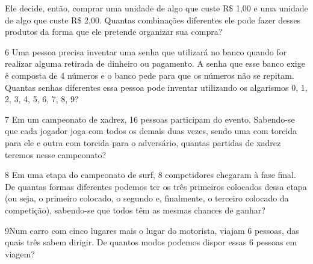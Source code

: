 Ele decide, então, comprar uma unidade de algo que custe R\$ 1,00 e uma unidade de
algo que custe R\$ 2,00. Quantas combinações diferentes ele pode fazer
desses produtos da forma que ele pretende organizar sua compra?

\begin{emptybox}
\end{emptybox}

\pagebreak
\num{6} Uma pessoa precisa inventar uma senha que utilizará no banco quando
for realizar alguma retirada de dinheiro ou pagamento. A senha que esse
banco exige é composta de 4 números e o banco pede para que os números
não se repitam. Quantas senhas diferentes essa pessoa pode inventar
utilizando os algarismos 0, 1, 2, 3, 4, 5, 6, 7, 8, 9?

\begin{emptybox}
\bigskip\bigskip
\end{emptybox}

\num{7} Em um campeonato de xadrez, 16 pessoas participam do evento.
Sabendo-se que cada jogador joga com todos os demais duas vezes, sendo
uma com torcida para ele e outra com torcida para o adversário, quantas
partidas de xadrez teremos nesse campeonato?

\begin{emptybox}
\bigskip\bigskip
\end{emptybox}

\num{8} Em uma etapa do campeonato de surf, 8 competidores chegaram à fase
final. De quantas formas diferentes podemos ter os três primeiros
colocados dessa etapa (ou seja, o primeiro colocado, o segundo e,
finalmente, o terceiro colocado da competição), sabendo-se que todos
têm as mesmas chances de ganhar?

\begin{emptybox}
\bigskip\bigskip
\end{emptybox}

\num{9}Num carro com cinco lugares mais o lugar do motorista, viajam 6
pessoas, das quais três sabem dirigir. De quantos modos podemos dispor
essas 6 pessoas em viagem?

